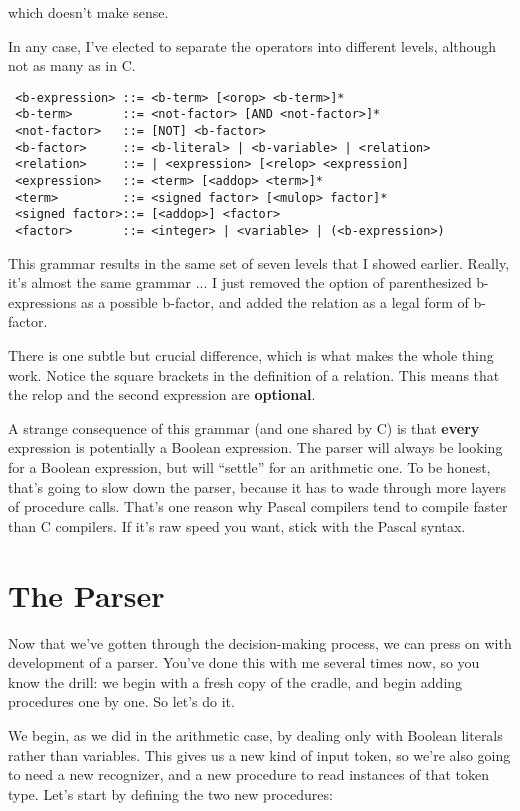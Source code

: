 which doesn't make sense.

In  any  case, I've  elected  to  separate  the  operators  into different levels, although not as many as in C.

\begin{verbatim}
 <b-expression> ::= <b-term> [<orop> <b-term>]*
 <b-term>       ::= <not-factor> [AND <not-factor>]*
 <not-factor>   ::= [NOT] <b-factor>
 <b-factor>     ::= <b-literal> | <b-variable> | <relation>
 <relation>     ::= | <expression> [<relop> <expression]
 <expression>   ::= <term> [<addop> <term>]*
 <term>         ::= <signed factor> [<mulop> factor]*
 <signed factor>::= [<addop>] <factor>
 <factor>       ::= <integer> | <variable> | (<b-expression>)
\end{verbatim}

This grammar  results  in  the  same  set  of seven levels that I showed earlier. Really, it's almost the same grammar ... I just removed the option of parenthesized b-expressions  as  a possible b-factor, and added the relation as a legal form of b-factor.

There is one subtle but crucial difference, which  is  what makes the  whole  thing  work. Notice  the  square brackets  in  the definition  of a relation. This means that  the relop and the second expression are {\bfseries optional}.

A strange consequence of this grammar (and one shared  by  C)  is that {\bfseries every} expression  is  potentially a Boolean expression. The parser will always be looking  for a Boolean expression, but will ``settle'' for an arithmetic one. To be honest, that's  going  to slow down the parser, because it has to wade through  more layers of procedure calls. That's  one reason why Pascal compilers tend to compile faster than C compilers. If it's raw speed  you want, stick with the Pascal syntax.

\section{The Parser}

Now that we've gotten through the decision-making process, we can press on with development of a parser. You've done this  with me several times now, so you know  the  drill: we begin with a fresh copy of the cradle, and begin  adding  procedures one by one. So let's do it.

We begin, as we did in the arithmetic case, by dealing  only with Boolean literals rather than variables. This gives us a new kind of input token, so we're also going to need a new recognizer, and a  new procedure to read instances of that  token  type. Let's start by defining the two new procedures:

